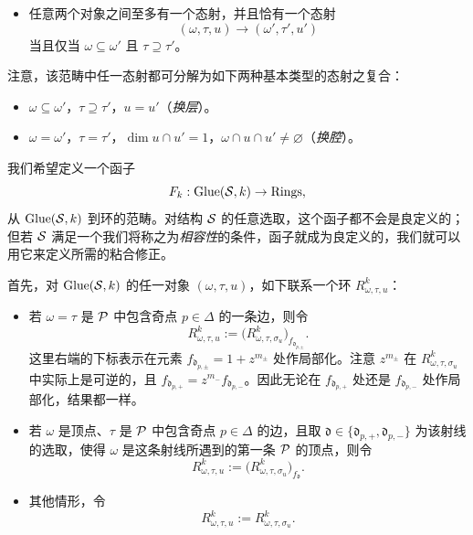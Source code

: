 
\begin{itemize}[leftmargin=1.6em,itemsep=2pt]
\item 任意两个对象之间至多有一个态射，并且恰有一个态射
  \[
    (\omega,\tau,u)\to(\omega',\tau',u')
  \]
  当且仅当 $\omega\subseteq\omega'$ 且 $\tau\supseteq\tau'$。
\end{itemize}

注意，该范畴中任一态射都可分解为如下两种基本类型的态射之复合：
\begin{itemize}[leftmargin=1.6em,itemsep=2pt]
\item[(I)] $\omega\subseteq\omega'$，$\tau\supseteq\tau'$，$u=u'$（\emph{换层}）。
\item[(II)] $\omega=\omega'$，$\tau=\tau'$，$\dim u\cap u'=1$，$\omega\cap u\cap u'\ne\varnothing$（\emph{换腔}）。
\end{itemize}


我们希望定义一个函子
\[
  F_k:\operatorname{Glue}(\mathcal{S},k)\to\operatorname{Rings},
\]
从 $\operatorname{Glue}(\mathcal{S},k)$ 到环的范畴。对结构 $\mathcal{S}$ 的任意选取，这个函子都不会是良定义的；但若 $\mathcal{S}$ 满足一个我们将称之为\emph{相容性}的条件，函子就成为良定义的，我们就可以用它来定义所需的粘合修正。

首先，对 $\operatorname{Glue}(\mathcal{S},k)$ 的任一对象 $(\omega,\tau,u)$，如下联系一个环 $R^k_{\omega,\tau,u}$：
\begin{itemize}[leftmargin=1.6em,itemsep=2pt]
\item 若 $\omega=\tau$ 是 $\mathcal{P}$ 中包含奇点 $p\in\Delta$ 的一条边，则令
  \[
    R^k_{\omega,\tau,u}:=\bigl(R^k_{\omega,\tau,\sigma_u}\bigr)_{f_{\mathfrak d_{p,\pm}}}.
  \]
  这里右端的下标表示在元素 $f_{\mathfrak d_{p,\pm}}=1+z^{m_\pm}$ 处作局部化。注意 $z^{m_\pm}$ 在 $R^k_{\omega,\tau,\sigma_u}$ 中实际上是可逆的，且 $f_{\mathfrak d_{p,+}}=z^{m_-}f_{\mathfrak d_{p,-}}$。因此无论在 $f_{\mathfrak d_{p,+}}$ 处还是 $f_{\mathfrak d_{p,-}}$ 处作局部化，结果都一样。
\item 若 $\omega$ 是顶点、$\tau$ 是 $\mathcal{P}$ 中包含奇点 $p\in\Delta$ 的边，且取 $\mathfrak d\in\{\mathfrak d_{p,+},\mathfrak d_{p,-}\}$ 为该射线的选取，使得 $\omega$ 是这条射线所遇到的第一条 $\mathcal{P}$ 的顶点，则令
  \[
    R^k_{\omega,\tau,u}:=\bigl(R^k_{\omega,\tau,\sigma_u}\bigr)_{f_\mathfrak d}.
  \]
\item 其他情形，令
  \[
    R^k_{\omega,\tau,u}:=R^k_{\omega,\tau,\sigma_u}.
  \]
\end{itemize}

